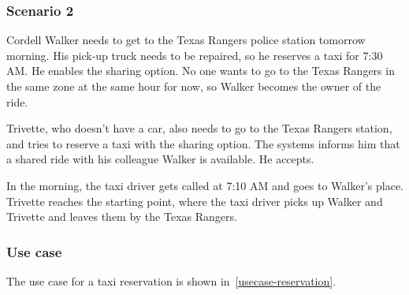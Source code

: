 \subsubsection{Scenario 2}
Cordell Walker needs to get to the Texas Rangers police station tomorrow morning.
His pick-up truck needs to be repaired, so he reserves a taxi for 7:30 AM. He enables the sharing option.
No one wants to go to the Texas Rangers in the same zone at the same hour for now, so Walker becomes the owner of the ride.

Trivette, who doesn't have a car, also needs to go to the Texas Rangers station, and tries to reserve a taxi with the sharing option.
The systems informs him that a shared ride with his colleague Walker is available. He accepts.

In the morning, the taxi driver gets called at 7:10 AM and goes to Walker's place.
Trivette reaches the starting point, where the taxi driver picks up Walker and Trivette and leaves them by the Texas Rangers.

\subsubsection{Use case}
The use case for a taxi reservation is shown in~\autoref{usecase-reservation}.


